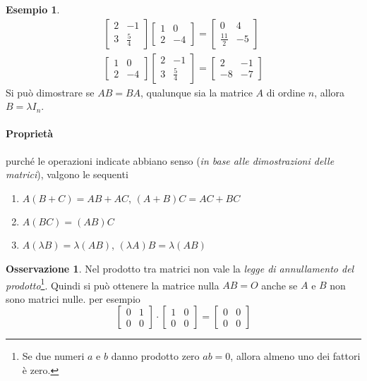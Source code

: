\documentclass{book}
\theoremstyle{definition}
\newtheorem{es}{Esempio}[section]
\newtheorem{oss}{Osservazione}[section]
\theoremstyle{plain}
\begin{document}
\begin{es}
  \label{es:prodmtxrigcol2}
  \begin{eqnarray*}
    \begin{bmatrix}
      2 & -1\\
      3 & \frac{5}{4}
    \end{bmatrix}
    \begin{bmatrix}
      1 & 0 \\
      2 & -4
    \end{bmatrix}=
    \begin{bmatrix}
      0 & 4\\
      \frac{11}{2} & -5
    \end{bmatrix}\\
    \begin{bmatrix}
      1 & 0 \\
      2 & -4
    \end{bmatrix}
    \begin{bmatrix}
      2 & -1 \\
      3 & \frac{5}{4}
    \end{bmatrix}=
    \begin{bmatrix}
      2 & -1 \\
      -8 & -7
    \end{bmatrix}
  \end{eqnarray*}
  Si può dimostrare se $AB=BA$, qualunque sia la matrice $A$ di ordine $n$, allora
  $B=\lambda I_n$.
  
  \paragraph{Proprietà} purché le operazioni indicate abbiano senso (\textit{in base
    alle dimostrazioni delle matrici}), valgono le sequenti
  \begin{enumerate}
  \item $A(B+C)=AB+AC$, $(A+B)C=AC+BC$
  \item $A(BC)=(AB)C$
  \item $A(\lambda B)=\lambda (AB)$, $(\lambda A)B=\lambda(AB)$
  \end{enumerate}
\end{es}
\begin{oss}
  \label{oss:prodmtxrigcol2}
  Nel prodotto tra matrici non vale la \textit{legge di annullamento del
    prodotto}\footnote{Se due numeri $a$ e $b$ danno prodotto zero $ab=0$, allora
    almeno uno dei fattori è zero.}. Quindi si può ottenere la matrice nulla $AB=O$
  anche se $A$ e $B$ non sono matrici nulle. per esempio
  \begin{equation*}
    \begin{bmatrix}
      0 & 1 \\
      0 & 0
    \end{bmatrix}\cdot
    \begin{bmatrix}
      1 & 0 \\
      0 & 0
    \end{bmatrix} =
    \begin{bmatrix}
      0 & 0 \\
      0 & 0
    \end{bmatrix}
  \end{equation*}
\end{oss}
\end{document}
